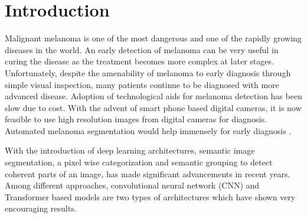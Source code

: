 \section{Introduction}

Malignant melanoma is one of the most dangerous and one of the rapidly growing diseases in the world. An early detection of melanoma can be very useful in curing the disease as the treatment becomes more complex at later stages. Unfortunately, despite the amenability of melanoma to early diagnosis through simple visual inspection, many patients continue to be diagnosed with more advanced disease. Adoption of technological aids for melanoma detection has been slow due to cost. With the advent of smart phone based digital cameras, it is now feasible to use high resolution images from digital cameras for diagnosis. Automated melanoma segmentation would help immensely for early diagnosis \citep{isic-2021-about}.

\par
With the introduction of deep learning architectures, semantic image segmentation, a pixel wise categorization and semantic grouping to detect coherent parts of an image, has made significant advancements in recent years. Among different approaches, convolutional neural network (CNN) and Transformer based models are two types of architectures which have shown very encouraging results.


